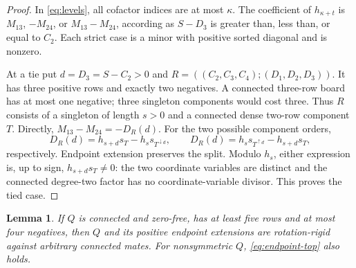 \documentclass[11pt,a4paper]{amsart}
\numberwithin{equation}{section}
\theoremstyle{plain}
\newtheorem{lemma}[theorem]{Lemma}
\theoremstyle{definition}
\begin{document}
\begin{proof}
In \eqref{eq:levels}, all cofactor indices are at most \(\kappa\).
The coefficient of \(h_{\kappa+t}\) is \(M_{13}\), \(-M_{24}\), or
\(M_{13}-M_{24}\), according as \(S-D_3\) is greater than, less than,
or equal to \(C_2\).  Each strict case is a minor with positive sorted
diagonal and is nonzero.

At a tie put \(d=D_3=S-C_2>0\) and
\(R=((C_2,C_3,C_4);(D_1,D_2,D_3))\).  It has three positive rows and
exactly two negatives.  A connected three-row board has at most one
negative; three singleton components would cost three.  Thus \(R\)
consists of a singleton of length \(s>0\) and a connected dense two-row
component \(T\).  Directly, \(M_{13}-M_{24}=-D_R(d)\).
For the two possible component orders,
\[
 D_R(d)=h_{s+d}s_T-h_s s_{T^{\downarrow d}},\qquad
 D_R(d)=h_s s_{T^{\uparrow d}}-h_{s+d}s_T,
\]
respectively.  Endpoint extension preserves the split.  Modulo \(h_s\),
either expression is, up to sign, \(h_{s+d}s_T\ne0\): the two coordinate
variables are distinct and the connected degree-two factor has no
coordinate-variable divisor.  This proves the tied case.
\end{proof}

\begin{lemma}\label{lem:small-negative-endpoint}
If \(Q\) is connected and zero-free, has at least five rows and at most four negatives, then \(Q\) and its positive endpoint extensions are rotation-rigid against arbitrary connected mates.  For nonsymmetric \(Q\), \eqref{eq:endpoint-top} also holds.
\end{lemma}
\end{document}
